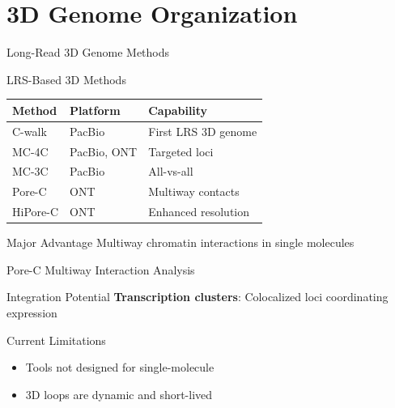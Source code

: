 \documentclass[aspectratio=169]{beamer}
\begin{document}
\section{3D Genome Organization}

\begin{frame}{Long-Read 3D Genome Methods}
  \begin{block}{LRS-Based 3D Methods}
    \begin{table}
      \small
      \begin{tabular}{|l|l|l|}
        \hline
        \rowcolor{conesaLightGray}
        \textbf{Method} & \textbf{Platform} & \textbf{Capability} \\
        \hline
        C-walk & PacBio & First LRS 3D genome \\
        \hline
        MC-4C & PacBio, ONT & Targeted loci \\
        \hline
        MC-3C & PacBio & All-vs-all \\
        \hline
        Pore-C & ONT & Multiway contacts \\
        \hline
        HiPore-C & ONT & Enhanced resolution \\
        \hline
      \end{tabular}
    \end{table}
  \end{block}

  \begin{alertblock}{Major Advantage}
    Multiway chromatin interactions in single molecules
  \end{alertblock}
\end{frame}

\begin{frame}{Pore-C Multiway Interaction Analysis}
  \begin{block}{Integration Potential}
    \textbf{Transcription clusters}: Colocalized loci coordinating expression
  \end{block}

  \begin{block}{Current Limitations}
    \begin{itemize}
      \item Tools not designed for single-molecule
      \item 3D loops are dynamic and short-lived
    \end{itemize}
  \end{block}
\end{frame}

\end{document}
